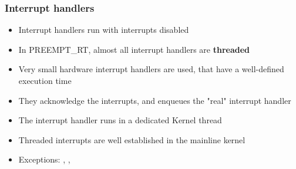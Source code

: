 \begin{frame}
  \frametitle{Interrupt handlers}
        \begin{itemize}
                \item Interrupt handlers run with interrupts disabled
                \item In PREEMPT\_RT, almost all interrupt handlers are \textbf{threaded}
                \item Very small hardware interrupt handlers are used, that have a well-defined execution time
                \item They acknowledge the interrupts, and enqueues the "real" interrupt handler
                \item The interrupt handler runs in a dedicated Kernel thread
                \item Threaded interrupts are well established in the mainline kernel
                \item Exceptions: , , 
        \end{itemize}
\end{frame}

